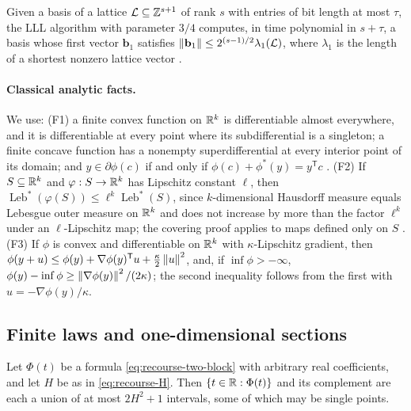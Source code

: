 \begin{theorem}
\label{thm:recourse-lll}
Given a basis of a lattice $\mathcal L\subseteq\mathbb Z^{s+1}$ of rank $s$
with entries of bit length at most $\tau$, the LLL algorithm with
parameter $3/4$ computes, in time polynomial in $s+\tau$, a basis whose
first vector $\mathbf b_1$ satisfies
$\left\lVert\mathbf b_1\right\rVert\le2^{(s-1)/2}\lambda_1(\mathcal L)$, where
$\lambda_1$ is the length of a shortest nonzero lattice vector
\citep{LenstraLenstraLovasz1982}.
\end{theorem}

\paragraph{Classical analytic facts.}
We use: (F1) a finite convex function on $\mathbb R^k$ is differentiable almost
everywhere, and it is differentiable at every point where its
subdifferential is a singleton; a finite concave function has a
nonempty superdifferential at every interior point of its domain; and
$y\in\partial\phi(c)$ if and only if $\phi(c)+\phi^*(y)=y^{\mathsf T}c$
\citep[Theorems~23.4, 23.5, 25.1, 25.5]{Rockafellar1970}. (F2) If
$S\subseteq\mathbb R^k$ and $\varphi:S\to\mathbb R^k$ has Lipschitz constant $\ell$,
then $\operatorname{Leb}^*(\varphi(S))\le\ell^k\operatorname{Leb}^*(S)$,
since $k$-dimensional Hausdorff measure equals Lebesgue outer measure on
$\mathbb R^k$ and does not increase by more than the factor $\ell^k$ under an
$\ell$-Lipschitz map; the covering proof applies to maps defined only
on $S$ \citep[Section~2.4]{EvansGariepy2015}. (F3) If $\phi$ is
convex and differentiable on $\mathbb R^k$ with $\kappa$-Lipschitz gradient,
then $\phi(y+u)\le\phi(y)+\nabla\phi(y)^{\mathsf T}u+\frac\kappa2\left\lVert u\right\rVert^2$,
and, if $\inf\phi>-\infty$,
$\phi(y)-\inf\phi\ge\left\lVert\nabla\phi(y)\right\rVert^2/(2\kappa)$; the second
inequality follows from the first with $u=-\nabla\phi(y)/\kappa$.

\subsection{Finite laws and one-dimensional sections}
\label{app:recourse-sections}

\begin{lemma}
\label{lem:recourse-sections}
Let $\Phi(t)$ be a formula \eqref{eq:recourse-two-block} with arbitrary
real coefficients, and let $H$ be as in \eqref{eq:recourse-H}. Then
$\{t\in\mathbb R:\Phi(t)\}$ and its complement are each a union of at most
$2H^2+1$ intervals, some of which may be single points.
\end{lemma}

